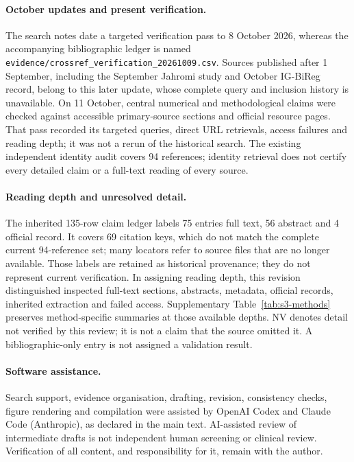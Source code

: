\documentclass[11pt,a4paper]{article}
\begin{document}
\paragraph{October updates and present verification.} The search notes date a targeted verification pass to 8 October 2026, whereas the accompanying bibliographic ledger is named \texttt{evidence/\allowbreak crossref\_verification\_\allowbreak 20261009.csv}. Sources published after 1 September, including the September Jahromi study and October IG-BiReg record, belong to this later update, whose complete query and inclusion history is unavailable. On 11 October, central numerical and methodological claims were checked against accessible primary-source sections and official resource pages. That pass recorded its targeted queries, direct URL retrievals, access failures and reading depth; it was not a rerun of the historical search. The existing independent identity audit covers 94 references; identity retrieval does not certify every detailed claim or a full-text reading of every source.

\paragraph{Reading depth and unresolved detail.} The inherited 135-row claim ledger labels 75 entries full text, 56 abstract and 4 official record. It covers 69 citation keys, which do not match the complete current 94-reference set; many locators refer to source files that are no longer available. Those labels are retained as historical provenance; they do not represent current verification. In assigning reading depth, this revision distinguished inspected full-text sections, abstracts, metadata, official records, inherited extraction and failed access. Supplementary Table~\ref{tab:s3-methods} preserves method-specific summaries at those available depths. NV denotes detail not verified by this review; it is not a claim that the source omitted it. A bibliographic-only entry is not assigned a validation result.

\paragraph{Software assistance.} Search support, evidence organisation, drafting, revision, consistency checks, figure rendering and compilation were assisted by OpenAI Codex and Claude Code (Anthropic), as declared in the main text. AI-assisted review of intermediate drafts is not independent human screening or clinical review. Verification of all content, and responsibility for it, remain with the author.
\end{document}
